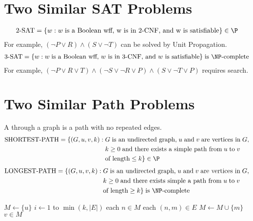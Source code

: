 \documentclass[a4paper]{report}
\newcommand{\bookref}[3]{\marginpar{\faBook{}~#1\\Chapter #2\\Section #3}}
\theoremstyle{definition}
\begin{document}
\section{Two Similar SAT Problems}
\bookref{ER}{28}{28.7.3}
\vspace{-0.3cm}%
\begin{align*}
\text{2-SAT} = \{w : w \;\text{is a Boolean wff, w is in 2-CNF, and w is satisfiable}\} \in \P
\end{align*}
%
For example, $(\neg P \vee R) \wedge (S \vee \neg T)$ can be solved by Unit Propagation.
%
\begin{align*}
\text{3-SAT} = \{w : w \;\text{is a Boolean wff, $w$ is in 3-CNF, and $w$ is satisfiable}\} \;\text{is \NP-complete}
\end{align*}
%
For example, $(\neg P \vee R \vee T) \wedge (\neg S \vee \neg R \vee P) \wedge (S \vee \neg T \vee P)$ requires search.

\section{Two Similar Path Problems}
\bookref{ER}{28}{28.7.4}
A  through a graph is a path with no repeated edges.
%
\begin{align*}
\text{SHORTEST-PATH} = \{ (G, u, v, k) : & \;G \; \text{is an undirected graph,} \;u \;\text{and} \;v \;\text{are vertices in} \; G,\\ & \; k \geq 0 \; \text{and there exists a simple path from} \; u \; \text{to} \; v \\ & \; \text{of length} \leq k \} \in \P
\end{align*}
%
\begin{align*}
\text{LONGEST-PATH} = \{ (G, u, v, k) : & \;G \; \text{is an undirected graph,} \;u \;\text{and} \;v \;\text{are vertices in} \; G,\\ & \; k \geq 0 \; \text{and there exists simple a path from} \; u \; \text{to} \; v \\ & \; \text{of length} \geq k \} \;\text{is \NP-complete}
\end{align*}

\begin{codebox}
\li $M \gets \{u\}$
\li \For $i \gets 1$ to $\min(k, |E|)$ \Do
\li \For each $n \in M$ \Do
\li \For each $(n,m) \in E$ \Do
\li $M \gets M \cup \{m\}$
\End
\End
\End
\li \If $v \in M$
\li \Then \Return {}
\End
\li \Return {}
\end{codebox}
\end{document}
